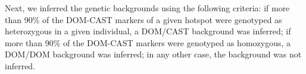 Next, we inferred the genetic backgrounds using the following criteria:
if more than 90\% of the DOM-CAST markers of a given hotspot were genotyped as heterozygous in a given individual, a DOM/CAST background was inferred;
if more than 90\% of the DOM-CAST markers were genotyped as homozygous, a DOM/DOM background was inferred;
in any other case, the background was not inferred.










